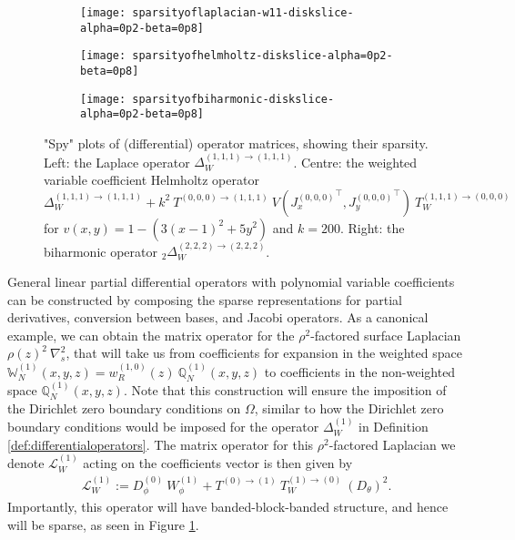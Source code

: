\documentclass[11pt, oneside]{article}   	%
\newcommand{\genjac}{R}
\newcommand{\genjacw}{w_\genjac}
\newcommand{\bigW}{\mathbb{W}}
\newcommand{\laplacewiii}{\Delta_W^{(1,1,1)\to(1,1,1)}}
\newcommand{\biharmonictwo}{_2\Delta_W^{(2,2,2)\to(2,2,2)}}
\newcommand{\bigscop}{{\mathbb{Q}}}
\newcommand{\bigscopN}{\bigscop_{N}}
\begin{document}
\begin{figure}[t]
	\begin{subfigure}{0.32\textwidth}
	\texttt{[image: sparsityoflaplacian-w11-diskslice-alpha=0p2-beta=0p8]}
        \centering
	\end{subfigure}
	\begin{subfigure}{0.32\textwidth}
	\texttt{[image: sparsityofhelmholtz-diskslice-alpha=0p2-beta=0p8]}
        \centering
	\end{subfigure}
	\begin{subfigure}{0.32\textwidth}
	\texttt{[image: sparsityofbiharmonic-diskslice-alpha=0p2-beta=0p8]}
        \centering
	\end{subfigure}
    	\caption{"Spy" plots of (differential) operator matrices, showing their sparsity. Left: the Laplace operator $\laplacewiii$. Centre: the weighted variable coefficient Helmholtz operator $\laplacewiii + k^2 \: T^{(0,0,0)\to(1,1,1)} \: V({J_x^{(0,0,0)}}^\top, {J_y^{(0,0,0)}}^\top) \: T_W^{(1,1,1)\to(0,0,0)}$ for $v(x,y) = 1 - (3(x-1)^2 + 5y^2)$ and $k = 200$. Right: the biharmonic operator $\biharmonictwo$.}
        \label{fig:sparsity}
        \centering
\end{figure}

General linear partial differential operators with polynomial variable coefficients can be constructed by composing the sparse representations for partial derivatives, conversion between bases, and Jacobi operators. As a canonical example, we can obtain the matrix operator for the $\rho^2$-factored surface Laplacian $\rho(z)^2 \: \nabla^2_s$, that will take us from coefficients for expansion in the weighted space $\bigW_N^{(1)}(x,y,z) = \genjacw^{(1,0)}(z) \: \bigscopN^{(1)}(x,y,z)$ to coefficients in the non-weighted space $\bigscopN^{(1)}(x,y,z)$. Note that this construction will ensure the imposition of the Dirichlet zero boundary conditions on $\Omega$, similar to how the Dirichlet zero boundary conditions would be imposed for the operator $\Delta^{(1)}_W$ in Definition \ref{def:differentialoperators}. The matrix operator for this $\rho^2$-factored Laplacian we denote $\mathcal{L}_W^{(1)}$ acting on the coefficients vector is then given by
\begin{align*}
    \mathcal{L}_W^{(1)} := D_\phi^{(0)} \: W_\phi^{(1)} + T^{(0)\to(1)} \: T_W^{(1)\to(0)} \: (D_\theta)^2.
\end{align*}
Importantly, this operator will have banded-block-banded structure, and hence will be sparse, as seen in Figure \ref{fig:sparsity}.
\end{document}
